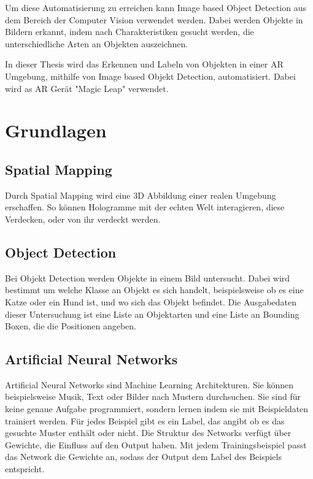 \documentclass[german,a4paper, 12pt]{llncs}
\begin{document}
Um diese Automatisierung zu erreichen kann Image based Object Detection aus dem Bereich der Computer Vision verwendet werden.
Dabei werden Objekte in Bildern erkannt, indem nach Charakteristiken gesucht werden, die unterschiedliche Arten an Objekten auszeichnen.\cite{introToCNN}

In dieser Thesis wird das Erkennen und Labeln von Objekten in einer AR Umgebung, mithilfe von Image based Objekt Detection, automatisiert. 
Dabei wird as AR Gerät "Magic Leap" verwendet. 


\section{Grundlagen}
\subsection*{Spatial Mapping} 
Durch Spatial Mapping wird eine 3D Abbildung einer realen Umgebung erschaffen. So können Hologramme mit der echten Welt interagieren, diese Verdecken, oder von ihr verdeckt werden.\cite{spatialMapping} 

\subsection*{Object Detection}
Bei Objekt Detection werden Objekte in einem Bild untersucht. Dabei wird bestimmt um welche Klasse an Objekt es sich handelt, beispielsweise ob es eine Katze oder ein Hund ist, und wo sich das Objekt befindet. Die Ausgabedaten dieser Untersuchung ist eine Liste an Objektarten und eine Liste an Bounding Boxen, die die Positionen angeben.

\subsection*{Artificial Neural Networks}
Artificial Neural Networks sind Machine Learning Architekturen. Sie können beispielsweise Musik, Text oder Bilder nach Mustern durchsuchen. Sie sind für keine genaue Aufgabe programmiert, sondern lernen indem sie mit Beispieldaten trainiert werden. Für jedes Beispiel gibt es ein Label, das angibt ob es das gesuchte Muster enthält oder nicht. Die Struktur des Networks verfügt über Gewichte, die Einfluss auf den Output haben. Mit jedem Trainingsbeispiel passt das Network die Gewichte an, sodass der Output dem Label des Beispiels entspricht.\cite{introToCNN,surveyOfDeepLearing}
\end{document}
